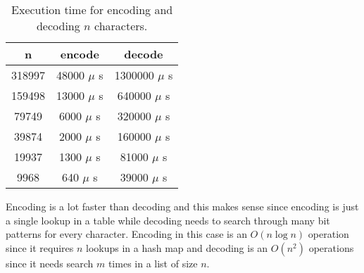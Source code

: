 \documentclass[a4paper,11pt]{article}
\begin{document}
\begin{table}[H]
\centering
\begin{tabular}{|c|c|c|}
\hline
\textbf{n} & \textbf{encode} & \textbf{decode} \\
\hline
  318997 & 48000 $\mu$ s & 1300000 $\mu$ s \\
  159498 & 13000 $\mu$ s & 640000 $\mu$ s \\
  79749 & 6000 $\mu$ s & 320000 $\mu$ s \\
  39874 & 2000 $\mu$ s & 160000 $\mu$ s \\
  19937 & 1300 $\mu$ s & 81000 $\mu$ s \\
  9968 & 640 $\mu$ s & 39000 $\mu$ s \\
\hline
\end{tabular}
\caption{Execution time for encoding and decoding $n$ characters.}
\label{tab:table1}
\end{table}

Encoding is a lot faster than decoding and this makes sense since encoding is just a single lookup in a table while decoding needs to search through many bit patterns for every character.
Encoding in this case is an $O(n \log n)$ operation since it requires $n$ lookups in a hash map and decoding is an $O(n^2)$ operations since it needs search $m$ times in a list of size $n$.
\end{document}
